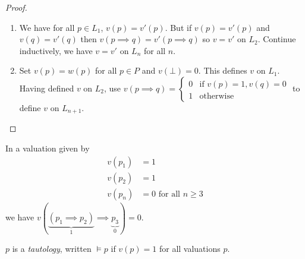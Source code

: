 \documentclass[a4paper]{article}
\begin{document}
\begin{proof}\leavevmode
  \begin{enumerate}
  \item We have for all \(p \in L_1\), \(v(p) = v'(p)\). But if \(v(p) = v'(p)\) and \(v(q) = v'(q)\) then \(v(p \implies q) = v'(p \implies q)\) so \(v = v'\) on \(L_2\). Continue inductively, we have \(v = v'\) on \(L_n\) for all \(n\).
  \item Set \(v(p) = w(p)\) for all \(p \in P\) and \(v(\bot) = 0\). This defines \(v\) on \(L_1\). Having defined \(v\) on \(L_2\), use \(v(p \implies q) = \begin{cases} 0 & \text{if } v(p) = 1, v(q) = 0 \\ 1 & \text{otherwise} \end{cases}\) to define \(v\) on \(L_{n + 1}\).
  \end{enumerate}
\end{proof}

\begin{eg}
  In a valuation given by
  \begin{align*}
    v(p_1) &= 1 \\
    v(p_2) &= 1 \\
    v(p_n) &= 0 \text{ for all } n \geq 3
  \end{align*}
  we have \(v(\underbrace{(p_1 \implies p_2)}_{1} \implies \underbrace{p_3}_{0}) = 0\).
\end{eg}

\begin{definition}[Tautology]
  \(p\) is a \emph{tautology}, written \(\models p\) if \(v(p) = 1\) for all valuations \(p\).
\end{definition}
\end{document}
